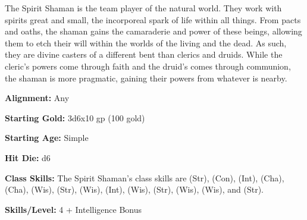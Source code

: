 
The Spirit Shaman is the team player of the natural world. They work with spirits great and small, the incorporeal spark of life within all things. From pacts and oaths, the shaman gains the camaraderie and power of these beings, allowing them to etch their will within the worlds of the living and the dead. As such, they are divine casters of a different bent than clerics and druids. While the cleric's powers come through faith and the druid's comes through communion, the shaman is more pragmatic, gaining their powers from whatever is nearby.

\textbf{Alignment:} Any

\textbf{Starting Gold:} 3d6x10 gp (100 gold)

\textbf{Starting Age:} Simple

\textbf{Hit Die:} d6

\textbf{Class Skills:} The Spirit Shaman's class skills are  (Str),  (Con),  (Int),  (Cha),  (Cha),  (Wis),  (Str),  (Wis),  (Int),  (Wis),  (Str),  (Wis),  (Wis), and  (Str).

\textbf{Skills/Level:} 4 + Intelligence Bonus

\poorbab{}
\poorfor{}
\poorref{}
\goodwil{}

